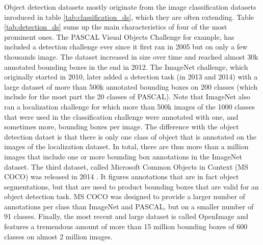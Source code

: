 Object detection datasets mostly originate from the image classification datasets inroduced in table \ref{tab:classification_ds}, which they are often extending. Table \ref{tab:detection_ds} sums up the main characteristics of four of the most prominent ones. The PASCAL Visual Objects Challenge \cite{Everingham10} for example, has included a detection challenge ever since it first ran in 2005 but on only a few thousands image. The dataset increased in size over time and reached almost 30k annotated bounding boxes in the end in 2012. The ImageNet challenge, which originally started in 2010, later added a detection task (in 2013 and 2014) with a large dataset of more than 500k annotated bounding boxes on 200 classes (which include for the most part the 20 classes of PASCAL). Note that ImageNet also ran a localization challenge for which more than 500k images of the 1000 classes that were used in the classification challenge were annotated with one, and sometimes more, bounding boxes per image. The difference with the object detection dataet is that there is only one class of object that is annotated on the images of the localization dataset. In total, there are thus more than a million images that include one or more bounding box annotations in the ImageNet dataset. The third dataset, called Microsoft Common Objects in Context (MS COCO) was released in 2014 \cite{lin2014microsoft}. It figures annotations that are in fact object segmentations, but that are used to product bounding boxes that are valid for an object detection task. MS COCO was designed to provide a larger number of annotations per class than ImageNet and PASCAL, but on a smaller number of 91 classes. Finally, the most recent and large dataset is called OpenImage \cite{OpenImages, OpenImages2} and features a tremendous amount of more than 15 million bounding boxes of 600 classes on almost 2 million images. 

